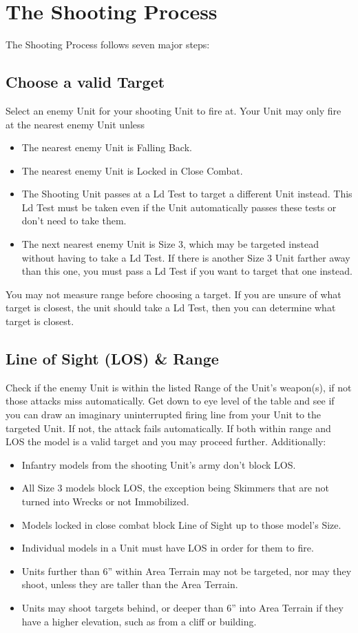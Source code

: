 \section{The Shooting Process}
The Shooting Process follows seven major steps:

\countsubsections

\subsection{Choose a valid Target}
\label{step:choosevalidtarget}
Select an enemy Unit for your shooting Unit to fire at. Your Unit
may only fire at the nearest enemy Unit unless

\begin{itemize}
\item The nearest enemy Unit is Falling Back.
\item The nearest enemy Unit is Locked in Close Combat.
\item The Shooting Unit passes at a Ld Test to target a different
Unit instead. This Ld Test must be taken even if the Unit
automatically passes these tests or don't need to take them.
\item The next nearest enemy Unit is Size 3, which may be
targeted instead without having to take a Ld Test. If there is
another Size 3 Unit farther away than this one, you must
pass a Ld Test if you want to target that one instead.
\end{itemize}

You may not measure range before choosing a target. If you
are unsure of what target is closest, the unit should take a Ld
Test, then you can determine what target is closest.


\subsection{Line of Sight (LOS) \& Range}
Check if the enemy Unit is within the listed Range of the Unit's
weapon(s), if not those attacks miss automatically. Get down
to eye level of the table and see if you can draw an imaginary
uninterrupted firing line from your Unit to the targeted Unit. If
not, the attack fails automatically. If both within range and LOS
the model is a valid target and you may proceed further.
Additionally:
\begin{itemize}
\item Infantry models from the shooting Unit's army don't block
LOS.
\item All Size 3 models block LOS, the exception being
Skimmers that are not turned into Wrecks or not
Immobilized.
\item  Models locked in close combat block Line of Sight up to
those model's Size.
\item  Individual models in a Unit must have LOS in order for
them to fire.
\item  Units further than 6” within Area Terrain may not be
targeted, nor may they shoot, unless they are taller than the
Area Terrain.
\item Units may shoot targets behind, or deeper than 6” into
Area Terrain if they have a higher elevation, such as from a
cliff or building.
\end{itemize}

